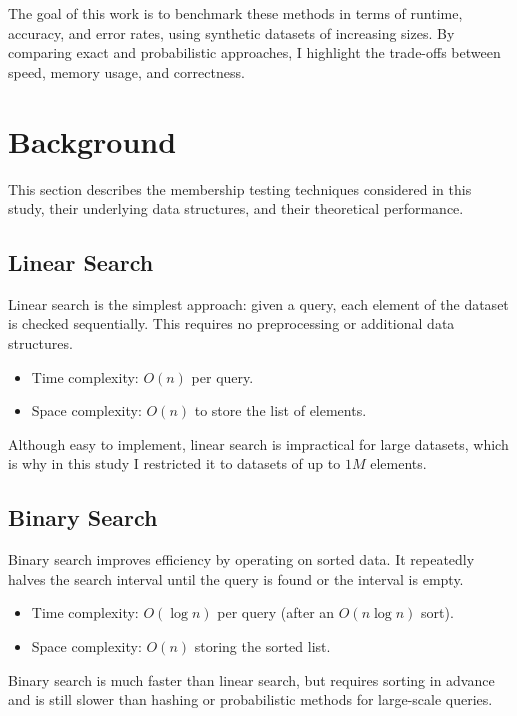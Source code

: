 \documentclass[acmsmall]{acmart}
\begin{document}
The goal of this work is to benchmark these methods in terms of runtime, accuracy, and error rates, using synthetic datasets of increasing sizes. By comparing exact and probabilistic approaches, I highlight the trade-offs between speed, memory  usage, and correctness.

\section{Background}
This section describes the membership testing techniques considered in this study, their underlying data structures, and their theoretical performance.

\subsection{Linear Search}
Linear search is the simplest approach: given a query, each element of the dataset is checked sequentially. This requires no preprocessing or additional data structures.  
\begin{itemize}
  \item Time complexity: $O(n)$ per query.  
  \item Space complexity: $O(n)$ to store the list of elements.  
\end{itemize}
Although easy to implement, linear search is impractical for large datasets, which is why in this study I restricted it to datasets of up to $1M$ elements.

\subsection{Binary Search}
Binary search improves efficiency by operating on sorted data. It repeatedly halves the search interval until the query is found or the interval is empty.  
\begin{itemize}
  \item Time complexity: $O(\log n)$ per query (after an $O(n \log n)$ sort).  
  \item Space complexity: $O(n)$ storing the sorted list.  
\end{itemize}
Binary search is much faster than linear search, but requires sorting in advance and is still slower than hashing or probabilistic methods for large-scale queries.
\end{document}
